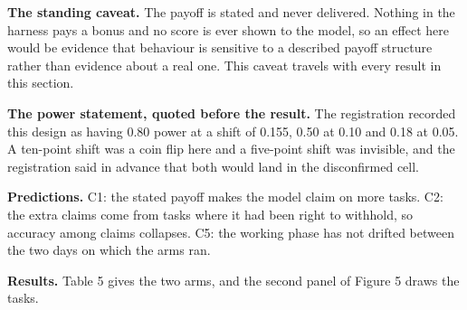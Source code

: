 \documentclass[11pt]{article}
\begin{document}
\textbf{The standing caveat.} The payoff is stated and never delivered. Nothing in the harness pays a bonus and no score is ever shown to the model, so an effect here would be evidence that behaviour is sensitive to a described payoff structure rather than evidence about a real one. This caveat travels with every result in this section.

\textbf{The power statement, quoted before the result.} The registration recorded this design as having 0.80 power at a shift of 0.155, 0.50 at 0.10 and 0.18 at 0.05. A ten-point shift was a coin flip here and a five-point shift was invisible, and the registration said in advance that both would land in the disconfirmed cell.

\textbf{Predictions.} C1: the stated payoff makes the model claim on more tasks. C2: the extra claims come from tasks where it had been right to withhold, so accuracy among claims collapses. C5: the working phase has not drifted between the two days on which the arms ran.

\textbf{Results.} Table 5 gives the two arms, and the second panel of Figure 5 draws the tasks.
\end{document}
